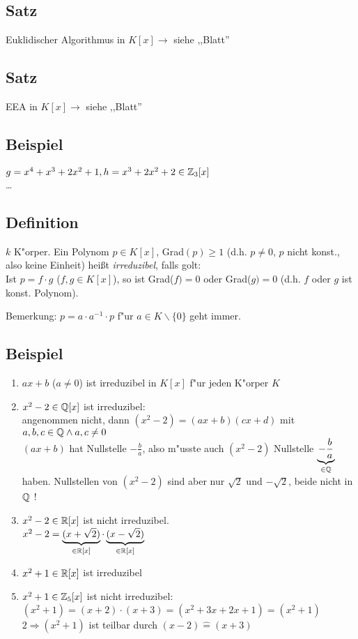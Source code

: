 
\subsection{Satz} Euklidischer Algorithmus in $K[x] \rightarrow$ siehe ,,Blatt''
\subsection{Satz} EEA in $K[x] \rightarrow$ siehe ,,Blatt''

\subsection{Beispiel}
$g=x^4+x^3 + 2x^2+1,  h= x^3+2x^2+2 \in \mathbb{Z}_3 [x]$\\
\dots

\subsection{Definition}
$k$ K"orper. Ein Polynom $p\in K[x]$, Grad$(p)\geq 1$ (d.h. $p\neq 0$, $p$ nicht konst., also keine Einheit) heißt \emph{irreduzibel}, falls golt: \\
Ist $p=f \cdot g$ ($f,g\in K[x]$), so ist Grad($f)= 0$ oder Grad($g)=0$ (d.h. $f$ oder $g$ ist konst. Polynom).

Bemerkung: $p= a \cdot a^{-1} \cdot p$ f"ur $a \in K \backslash \{0\}$ geht immer.
\subsection{Beispiel}
\begin{enumerate}
	\item
	$ax+b$ ($a \neq 0$) ist irreduzibel in $K[x]$ f"ur jeden K"orper $K$
	\item
	$x^2-2 \in \mathbb{Q}[x]$ ist irreduzibel:\\
	angenommen nicht, dann $(x^2-2) = (ax+b)(cx+d)$ mit $a,b,c \in \mathbb{Q} \land a,c \neq 0$\\
	$(ax+b)$ hat Nullstelle $-\frac{b}{a}$, also m"usste auch $(x^2-2)$ Nullstelle $\underbrace{-\frac{b}{a}}_{\in \mathbb{Q}}$ haben.
	Nullstellen von $(x^2-2)$ sind aber nur $\sqrt{2}$ und $-\sqrt{2}$, beide nicht in $\mathbb{Q}$ !
	\item
	$x^2-2 \in \mathbb{R}[x]$ ist nicht irreduzibel.\\
	$x^2-2 = \underbrace{(x+ \sqrt{2})}_{\in \mathbb{R}[x]} \cdot \underbrace{(x-\sqrt{2})}_{\in \mathbb{R}[x]}$
	\item
	$x^2+1 \in \mathbb{R}[x]$ ist irreduzibel
	\item
	$x^2+1 \in \mathbb{Z}_5[x]$ ist nicht irreduzibel:\\
	$(x^2 +1) = (x+2) \cdot (x+3) = (x^2 + 3x +2x +1) = (x^2+1)$\\
	$2 \Rightarrow (x^2+1)$ ist teilbar durch $(x-2) \hat{=} (x+3)$
\end{enumerate}


